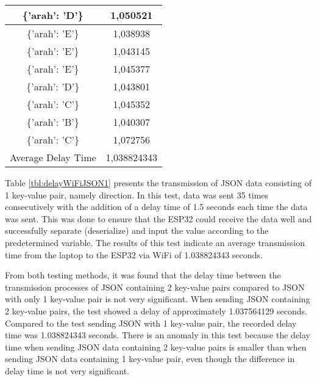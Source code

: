 \begin{table}[!h]
\begin{tabular}{|c|c|}
  \{'arah': 'D'\}    & 1,050521    \\ \hline
  \{'arah': 'E'\}    & 1,038938    \\ \hline
  \{'arah': 'E'\}    & 1,043145    \\ \hline
  \{'arah': 'E'\}    & 1,045377    \\ \hline
  \{'arah': 'D'\}    & 1,043801    \\ \hline
  \{'arah': 'C'\}    & 1,045352    \\ \hline
  \{'arah': 'B'\}    & 1,040307    \\ \hline
  \{'arah': 'C'\}    & 1,072756    \\ \hline
  Average Delay Time & 1,038824343 \\ \hline
  \end{tabular}
\end{table}

Table \ref{tbl:delayWiFiJSON1} presents the transmission of JSON data consisting of 1 key-value pair, namely direction. In this test, data was sent 35 times consecutively with the addition of a delay time of 1.5 seconds each time the data was sent. This was done to ensure that the ESP32 could receive the data well and successfully separate (deserialize) and input the value according to the predetermined variable. The results of this test indicate an average transmission time from the laptop to the ESP32 via WiFi of 1.038824343 seconds.

From both testing methods, it was found that the delay time between the transmission processes of JSON containing 2 key-value pairs compared to JSON with only 1 key-value pair is not very significant. When sending JSON containing 2 key-value pairs, the test showed a delay of approximately 1.037564129 seconds. Compared to the test sending JSON with 1 key-value pair, the recorded delay time was 1.038824343 seconds. There is an anomaly in this test because the delay time when sending JSON data containing 2 key-value pairs is smaller than when sending JSON data containing 1 key-value pair, even though the difference in delay time is not very significant.